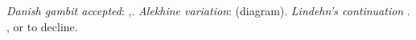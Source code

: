 \emph{Danish gambit accepted}: ,.
\emph{Alekhine variation}:  (diagram).
\emph{Lindehn's continuation} .
,  or  to decline.
